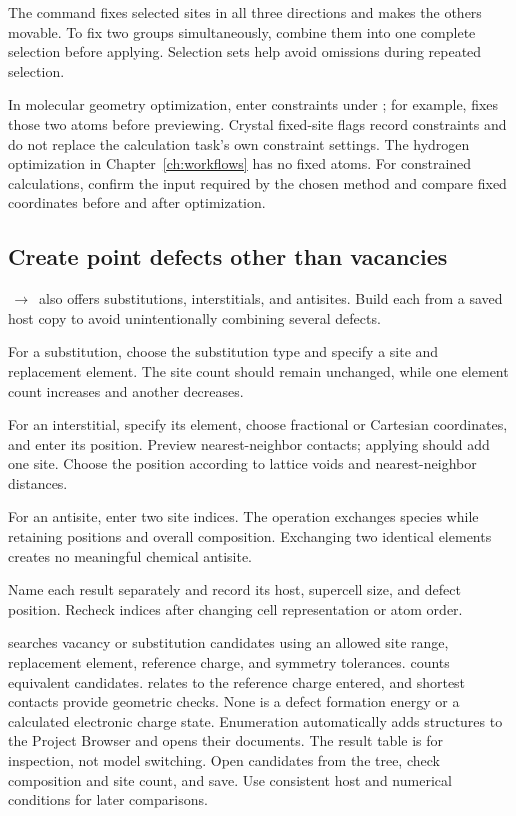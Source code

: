 The command fixes selected sites in all three directions and makes the others movable. To fix two groups simultaneously, combine them into one complete selection before applying. Selection sets help avoid omissions during repeated selection.

In molecular geometry optimization, enter constraints under ; for example,  fixes those two atoms before previewing. Crystal fixed-site flags record constraints and do not replace the calculation task's own constraint settings. The hydrogen optimization in Chapter~\ref{ch:workflows} has no fixed atoms. For constrained calculations, confirm the input required by the chosen method and compare fixed coordinates before and after optimization.

\subsection{Create point defects other than vacancies}\label{sec:other-defects-reference}

\,$\rightarrow$\, also offers substitutions, interstitials, and antisites. Build each from a saved host copy to avoid unintentionally combining several defects.

\begin{steps}
  \item For a substitution, choose the substitution type and specify a site and replacement element. The site count should remain unchanged, while one element count increases and another decreases.
  \item For an interstitial, specify its element, choose fractional or Cartesian coordinates, and enter its position. Preview nearest-neighbor contacts; applying should add one site. Choose the position according to lattice voids and nearest-neighbor distances.
  \item For an antisite, enter two site indices. The operation exchanges species while retaining positions and overall composition. Exchanging two identical elements creates no meaningful chemical antisite.
  \item Name each result separately and record its host, supercell size, and defect position. Recheck indices after changing cell representation or atom order.
\end{steps}

 searches vacancy or substitution candidates using an allowed site range, replacement element, reference charge, and symmetry tolerances.  counts equivalent candidates.  relates to the reference charge entered, and shortest contacts provide geometric checks. None is a defect formation energy or a calculated electronic charge state. Enumeration automatically adds structures to the Project Browser and opens their documents. The result table is for inspection, not model switching. Open candidates from the tree, check composition and site count, and save. Use consistent host and numerical conditions for later comparisons.

